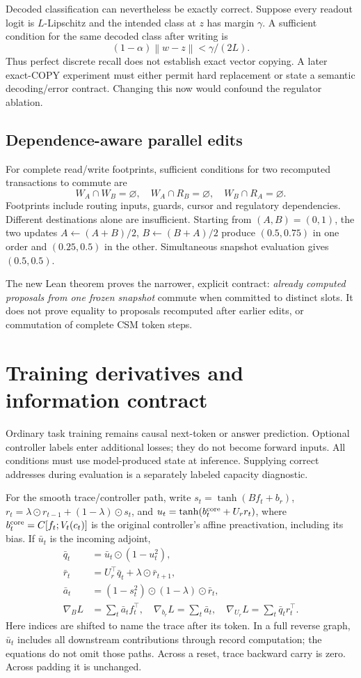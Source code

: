 \documentclass[11pt,a4paper]{article}
\newcommand{\norm}[1]{\left\lVert#1\right\rVert}
\begin{document}
Decoded classification can nevertheless be exactly correct. Suppose every
readout logit is \(L\)-Lipschitz and the intended class at \(z\) has margin
\(\gamma\). A sufficient condition for the same decoded class after writing is
\[
(1-\alpha)\norm{w-z}<\gamma/(2L).
\]
Thus perfect discrete recall does not establish exact vector copying. A later
exact-COPY experiment must either permit hard replacement or state a semantic
decoding/error contract. Changing this now would confound the regulator ablation.

\subsection{Dependence-aware parallel edits}
For complete read/write footprints, sufficient conditions for two recomputed
transactions to commute are
\[
W_A\cap W_B=\varnothing,\quad W_A\cap R_B=\varnothing,\quad W_B\cap R_A=\varnothing.
\]
Footprints include routing inputs, guards, cursor and regulatory dependencies.
Different destinations alone are insufficient. Starting from \((A,B)=(0,1)\),
the two updates \(A\leftarrow(A+B)/2\), \(B\leftarrow(B+A)/2\) produce
\((0.5,0.75)\) in one order and \((0.25,0.5)\) in the other. Simultaneous
snapshot evaluation gives \((0.5,0.5)\).

The new Lean theorem proves the narrower, explicit contract: \emph{already
computed proposals from one frozen snapshot} commute when committed to distinct
slots. It does not prove equality to proposals recomputed after earlier edits,
or commutation of complete CSM token steps.

\section{Training derivatives and information contract}
Ordinary task training remains causal next-token or answer prediction. Optional
controller labels enter additional losses; they do not become forward inputs.
All conditions must use model-produced state at inference. Supplying correct
addresses during evaluation is a separately labeled capacity diagnostic.

For the smooth trace/controller path, write \(s_t=\tanh(Bf_t+b_r)\),
\(r_t=\lambda\odot r_{t-1}+(1-\lambda)\odot s_t\), and
\(u_t=\tanh(b_t^{\rm core}+U_rr_t)\), where
\(b_t^{\rm core}=C[f_t;V_t(c_t)]\) is the original controller's affine
preactivation, including its bias. If \(\bar u_t\) is the incoming adjoint,
\begin{align}
\bar q_t&=\bar u_t\odot(1-u_t^2),\\
\bar r_t&=U_r^\top\bar q_t+\lambda\odot\bar r_{t+1},\\
\bar a_t&=(1-s_t^2)\odot(1-\lambda)\odot\bar r_t,\\
\nabla_B L&=\sum_t\bar a_t f_t^\top,\quad
\nabla_{b_r}L=\sum_t\bar a_t,\quad
\nabla_{U_r}L=\sum_t\bar q_t r_t^\top.
\end{align}
Here indices are shifted to name the trace after its token. In a full reverse
graph, \(\bar u_t\) includes all downstream contributions through record
computation; the equations do not omit those paths. Across a reset, trace
backward carry is zero. Across padding it is unchanged.
\end{document}
